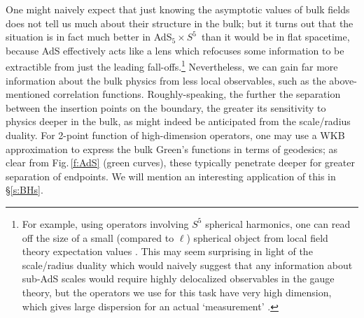\documentclass[12pt,a4paper]{article}
\def\sect#1{\S\ref{#1}}
\def\fig#1{Fig.\,\ref{#1}}
\def\GT{gauge theory}
\def\adss#1#2{AdS$_{#1} \times S^{#2}$}
\def\Rads{\ell}
\begin{document}
One might naively expect that just knowing the asymptotic values of bulk fields does not tell us much about their structure in the bulk; but it turns out that the situation is in fact much better in \adss55\ than it would be in flat spacetime, because AdS effectively acts like a lens which refocuses some information to be extractible from just the leading fall-offs.\footnote{
For example, using operators involving $S^5$ spherical harmonics, one can read off the size of a small  (compared to $\Rads$) spherical object from local field theory expectation values
\cite{Horowitz:2000fm}.
This may seem surprising in light of the scale/radius duality which would naively suggest that any information about sub-AdS scales would require highly delocalized observables in the \GT, but the operators we use for this task have very high dimension, which gives large dispersion for an actual `measurement' \cite{Hubeny:2000eu}.
}
Nevertheless, we can gain far more information about the bulk physics from less local observables, such as the above-mentioned correlation functions.  Roughly-speaking, the further the separation between the insertion points on the boundary, the greater its sensitivity to physics deeper in the bulk, as might indeed be anticipated from the scale/radius duality.  For 2-point function of high-dimension operators, one may use a WKB approximation to express the bulk Green's functions in terms of geodesics; as clear from \fig{f:AdS} (green curves), these typically penetrate deeper for greater separation of endpoints.
We will mention an interesting application of this in \sect{s:BHs}.
\end{document}
